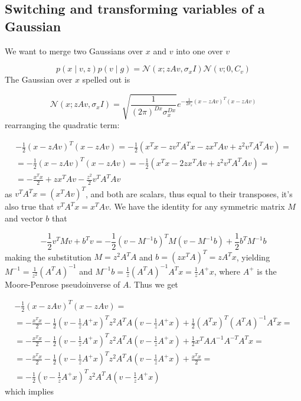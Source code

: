 \documentclass{paper}
\begin{document}
\subsection{Switching and transforming variables of a Gaussian} \label{sec:varswitch}

We want to merge two Gaussians over $x$ and $v$ into one over $v$

\begin{equation}
p(x \mid v,z) p(v \mid g) = \mathcal{N}(x;zAv,\sigma_x I) \mathcal{N}(v;0,C_v)
\end{equation}
%
The Gaussian over $x$ spelled out is

\begin{equation} 
\mathcal{N}(x;zAv,\sigma_x I) = \sqrt{\frac{1}{(2\pi)^{Dx} \sigma_x^{Dx}}}e^{-\frac{1}{2 \sigma_x} (x-zAv)^T(x-zAv)}
\end{equation}
%
rearranging the quadratic term:

\begin{equation} \label{eq:quad_rearrange}
\begin{split}
-\frac{1}{2} (x-zAv)^T(x-zAv) = -\frac{1}{2} (x^Tx - zv^TA^Tx - zx^TAv + z^2 v^TA^TAv) = \\
= -\frac{1}{2} (x-zAv)^T(x-zAv) = -\frac{1}{2} (x^Tx - 2zx^TAv + z^2 v^TA^TAv) = \\
= -\frac{x^Tx}{2} + zx^TAv -\frac{z^2}{2} v^TA^TAv
\end{split}
\end{equation}
%
as $v^TA^Tx = (x^TAv)^T$, and both are scalars, thus equal to their transposes, it's also true that $v^TA^Tx = x^TAv$. We have the identity for any symmetric matrix $M$ and vector $b$ that

\begin{equation} 
-\frac{1}{2} v^T M v + b^Tv = -\frac{1}{2} (v - M^{-1}b)^T M (v - M^{-1}b) + \frac{1}{2}b^T M^{-1} b
\end{equation}
%
making the substitution $M = z^2A^TA$ and $b = (zx^TA)^T=zA^Tx$, yielding $M^{-1} = \frac{1}{z^2}(A^TA)^{-1}$ and $M^{-1} b = \frac{1}{z}(A^TA)^{-1}A^Tx = \frac{1}{z}A^{+}x$, where $A^{+}$ is the Moore-Penrose pseudoinverse of $A$. Thus we get

\begin{equation}
\begin{split}
-\frac{1}{2} (x-zAv)^T(x-zAv) = \\
= -\frac{x^Tx}{2} -\frac{1}{2} (v - \frac{1}{z}A^{+}x)^T z^2A^TA (v - \frac{1}{z}A^{+}x)  + \frac{1}{2} (A^Tx)^T (A^TA)^{-1}A^Tx = \\
=-\frac{x^Tx}{2} -\frac{1}{2} (v - \frac{1}{z}A^{+}x)^T z^2A^TA (v - \frac{1}{z}A^{+}x)  + \frac{1}{2} x^T A A^{-1} A^{-T} A^T x = \\
= -\frac{x^Tx}{2} -\frac{1}{2} (v - \frac{1}{z}A^{+}x)^T z^2A^TA (v - \frac{1}{z}A^{+}x)  + \frac{x^Tx}{2} = \\
= -\frac{1}{2} (v - \frac{1}{z}A^{+}x)^T z^2A^TA (v - \frac{1}{z}A^{+}x)
\end{split}
\end{equation}
%
which implies
\end{document}
